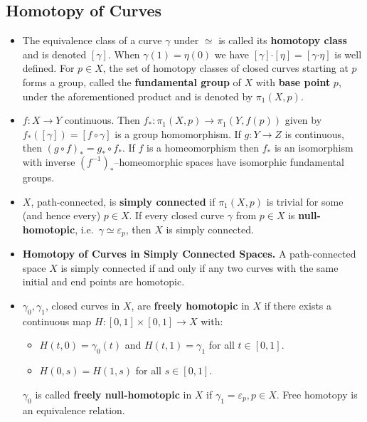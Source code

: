 \documentclass{article}
\newenvironment{topic}[1]{%
{\subsection{#1}}%
\begin{itemize}%
}{%
\end{itemize}%
}
\newcommand{\theorem}[1]{\item {\bf #1.}}
\newcommand{\term}[1]{{\bf #1}}
\newcommand{\remark}{\item}
\newcommand{\curveproduct}{\boldsymbol{\cdot}}
\begin{document}
\begin{topic}{Homotopy of Curves}
\remark The equivalence class of a curve $\gamma$ under $\simeq$ is called its \term{homotopy class} and is denoted $[\gamma]$. When $\gamma(1) = \eta(0)$ we have $[\gamma] \curveproduct [\eta] = [\gamma \curveproduct \eta]$ is well defined. For $p \in X$, the set of homotopy classes of closed curves starting at $p$ forms a group, called the \term{fundamental group} of $X$ with \term{base point} $p$, under the aforementioned product and is denoted by $\pi_1(X, p)$.

\remark $f : X \to Y$ continuous. Then $f_\ast : \pi_1(X, p) \to \pi_1(Y, f(p))$ given by $f_\ast([\gamma]) = [f \circ \gamma]$ is a group homomorphism. If $g : Y \to Z$ is continuous, then $(g \circ f)_\ast = g_\ast \circ f_\ast$. If $f$ is a homeomorphism then $f_\ast$ is an isomorphism with inverse $(f^{-1})_\ast$--homeomorphic spaces have isomorphic fundamental groups.

\remark $X$, path-connected, is \term{simply connected} if $\pi_1(X, p)$ is trivial for some (and hence every) $p \in X$. If every closed curve $\gamma$ from $p \in X$ is \term{null-homotopic}, i.e.\ $\gamma \simeq \varepsilon_p$, then $X$ is simply connected.

\theorem{Homotopy of Curves in Simply Connected Spaces} A path-connected space $X$ is simply connected if and only if any two curves with the same initial and end points are homotopic.

\remark $\gamma_0, \gamma_1$, closed curves in $X$, are \term{freely homotopic} in $X$ if there exists a continuous map $H : [0, 1] \times [0, 1] \to X$ with:
\begin{itemize}
\item $H(t, 0) = \gamma_0(t)$ and $H(t, 1) = \gamma_1$ for all $t \in [0, 1]$.
\item $H(0, s) = H(1, s)$ for all $s \in [0, 1]$.
\end{itemize}
$\gamma_0$ is called \term{freely null-homotopic} in $X$ if $\gamma_1 = \varepsilon_p, p \in X$. Free homotopy is an equivalence relation.

\end{topic}
\end{document}
